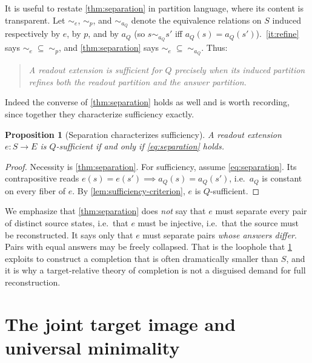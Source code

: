 \documentclass[11pt,reqno]{amsart}
\theoremstyle{plain}
\newtheorem{proposition}[theorem]{Proposition}
\theoremstyle{definition}
\newcommand{\Src}{S}
\begin{document}
It is useful to restate \cref{thm:separation} in partition language, where its content is
transparent. Let $\sim_e$, $\sim_p$, and $\sim_{a_Q}$ denote the equivalence relations on $\Src$
induced respectively by $e$, by $p$, and by $a_Q$ (so $s\sim_{a_Q}s'$ iff $a_Q(s)=a_Q(s')$).
\,\eqref{it:refine} says $\sim_e\;\subseteq\;\sim_p$, and
\cref{thm:separation} says $\sim_e\;\subseteq\;\sim_{a_Q}$. Thus:

\begin{quote}
\emph{A readout extension is sufficient for $Q$ precisely when its induced partition refines both
the readout partition and the answer partition.}
\end{quote}

Indeed the converse of \cref{thm:separation} holds as well and is worth recording, since together
they characterize sufficiency exactly.

\begin{proposition}[Separation characterizes sufficiency]\label{prop:separation-iff}
A readout extension $e\colon\Src\to E$ is $Q$-sufficient if and only if \eqref{eq:separation}
holds.
\end{proposition}

\begin{proof}
Necessity is \cref{thm:separation}. For sufficiency, assume \eqref{eq:separation}. Its
contrapositive reads $e(s)=e(s')\implies a_Q(s)=a_Q(s')$, i.e.\ $a_Q$ is constant on every fiber
of $e$. By \cref{lem:sufficiency-criterion}, $e$ is $Q$-sufficient.
\end{proof}

We emphasize that \cref{thm:separation} does \emph{not} say that $e$ must separate every pair of
distinct source states, i.e.\ that $e$ must be injective, i.e.\ that the source must be
reconstructed. It says only that $e$ must separate pairs \emph{whose answers differ}. Pairs with
equal answers may be freely collapsed. That is the loophole that \cref{sec:joint} exploits to
construct a completion that is often dramatically smaller than $\Src$, and it is why a
target-relative theory of completion is not a disguised demand for full reconstruction.

\section{The joint target image and universal minimality}\label{sec:joint}
\end{document}
